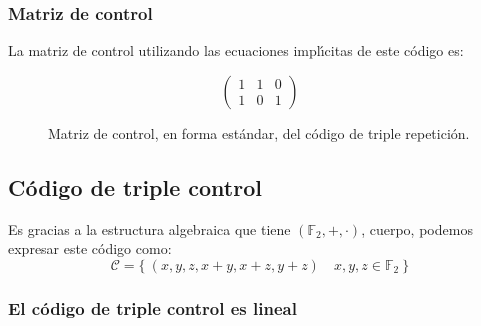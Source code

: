 \subsubsection{Matriz de control}

La matriz de control utilizando las ecuaciones impl\'{\i}citas de este c\'odigo
es:
\begin{figure}[\h]
\begin{displaymath}
\left( \begin{array}{ccc}
1&1&0\\
1&0&1
\end{array} \right)
\end{displaymath}
\caption{Matriz de control, en forma est\'andar, del c\'odigo de triple
repetici\'on.}
\end{figure}

%
%
\subsection{C\'odigo de triple control}

Es gracias a la estructura algebraica que tiene $(\mathbb{F}_2,+,\cdot )$,
cuerpo, podemos expresar este c\'odigo como:
\begin{displaymath}
\mathcal{C}=\{\ (x,y,z,x+y,x+z,y+z)\quad x,y,z\in \mathbb{F}_2\ \}
\end{displaymath}

\subsubsection{El c\'odigo de triple control es lineal}

